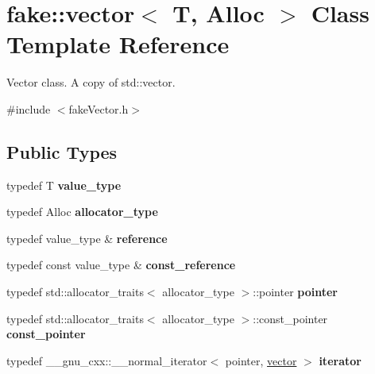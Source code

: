 \hypertarget{classfake_1_1vector}{}\section{fake\+:\+:vector$<$ T, Alloc $>$ Class Template Reference}
\label{classfake_1_1vector}


Vector class. A copy of std\+::vector.  




{\ttfamily \#include $<$fake\+Vector.\+h$>$}

\subsection*{Public Types}
\begin{DoxyCompactItemize}
\item 
\mbox{\label{classfake_1_1vector_abbcade9efee0cb25d5c801099de99981}} 
typedef T {\bfseries value\+\_\+type}
\item 
\mbox{\label{classfake_1_1vector_a12496987133d30408fe2e0cd47d20c29}} 
typedef Alloc {\bfseries allocator\+\_\+type}
\item 
\mbox{\label{classfake_1_1vector_a0287f76d70b14ce7371b3c31f8775bd8}} 
typedef value\+\_\+type \& {\bfseries reference}
\item 
\mbox{\label{classfake_1_1vector_a8a01ce111a60ff82d241498b6ddd1a46}} 
typedef const value\+\_\+type \& {\bfseries const\+\_\+reference}
\item 
\mbox{\label{classfake_1_1vector_a0088390bae81b7a6f0eb069f26666e23}} 
typedef std\+::allocator\+\_\+traits$<$ allocator\+\_\+type $>$\+::pointer {\bfseries pointer}
\item 
\mbox{\label{classfake_1_1vector_a2956bbdf422d34c6f4a2c3ed68f999ed}} 
typedef std\+::allocator\+\_\+traits$<$ allocator\+\_\+type $>$\+::const\+\_\+pointer {\bfseries const\+\_\+pointer}
\item 
\mbox{\label{classfake_1_1vector_a35dde54cafc2ee964558722ec5a489f7}} 
typedef \+\_\+\+\_\+gnu\+\_\+cxx\+::\+\_\+\+\_\+normal\+\_\+iterator$<$ pointer, \mbox{\hyperlink{classfake_1_1vector}{vector}} $>$ {\bfseries iterator}

\end{DoxyCompactItemize}
